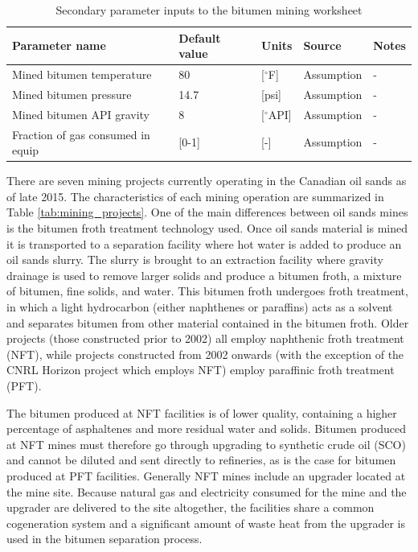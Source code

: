 \documentclass[11pt]{report}
\begin{document}
\begin{table}
\caption{Secondary parameter inputs to the bitumen mining worksheet}
\label{tab:bitumen_mining_SI}
\begin{scriptsize}
\begin{tabularx}{1\columnwidth}{p{}p{}p{}p{}p{}}
\toprule
Parameter name						& Default value   		& Units 	& Source			      			& Notes 		\\ 
\midrule
Mined bitumen temperature	 			& 80					& [$^\circ$F]	& Assumption				& -			\\
Mined bitumen pressure					& 14.7				& [psi] 		& Assumption				& -			\\
Mined bitumen API gravity					& 8					& [$^\circ$API]	& Assumption				& -			\\
Fraction of gas consumed in equip			& [0-1]				& [-]			& Assumption				& -			\\
\bottomrule
\end{tabularx}
\end{scriptsize}
\end{table}


\clearpage


There are seven mining projects currently operating in the Canadian oil sands as of late 2015. The characteristics of each mining operation are summarized in Table \ref{tab:mining_projects}. One of the main differences between oil sands mines is the bitumen froth treatment technology used. Once oil sands material is mined it is transported to a separation facility where hot water is added to produce an oil sands slurry. The slurry is brought to an extraction facility where gravity drainage is used to remove larger solids and produce a bitumen froth, a mixture of bitumen, fine solids, and water. This bitumen froth undergoes froth treatment, in which a light hydrocarbon (either naphthenes or paraffins) acts as a solvent and separates bitumen from other material contained in the bitumen froth.  Older projects (those constructed prior to 2002) all employ naphthenic froth treatment (NFT), while projects constructed from 2002 onwards (with the exception of the CNRL Horizon project which employs NFT) employ paraffinic froth treatment (PFT).  

The bitumen produced at NFT facilities is of lower quality, containing a higher percentage of asphaltenes and more residual water and solids. Bitumen produced at NFT mines must therefore go through upgrading to synthetic crude oil (SCO) and cannot be diluted and sent directly to refineries, as is the case for bitumen produced at PFT facilities. Generally NFT mines include an upgrader located at the mine site. Because natural gas and electricity consumed for the mine and the upgrader are delivered to the site altogether, the facilities share a common cogeneration system and a significant amount of waste heat from the upgrader is used in the bitumen separation process. 
\end{document}

